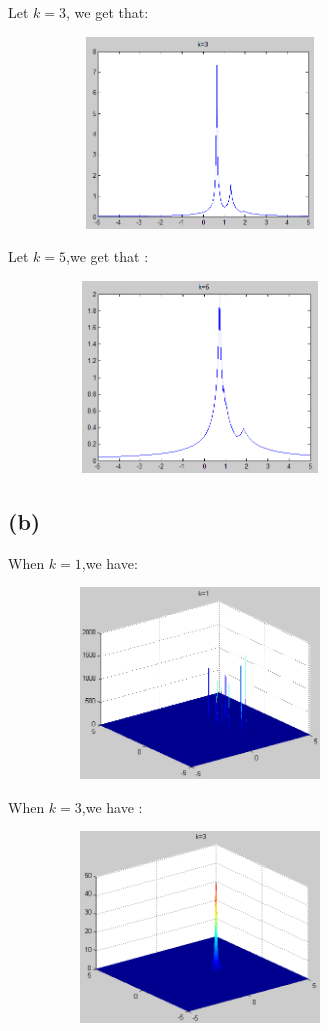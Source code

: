 \documentclass[10pt,a4paper]{article}
\begin{document}
Let $k=3$, we get that:

\includegraphics[height=2in,width=4in]{2.png}

Let $k=5$,we get that :

\includegraphics[height=2in,width=4in]{3.png}
\subsection{(b)}
When $k=1$,we have:

\includegraphics[height=2in,width=4in]{4.png}

When $k=3$,we have :

\includegraphics[height=2in,width=4in]{5.png}
\end{document}
